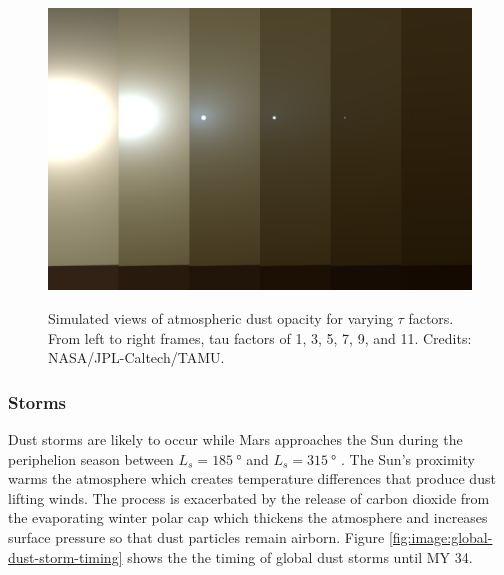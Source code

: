 
\begin{figure}[h]
  \centering
  \hypersetup{linkcolor=captionTextColor}
  \includegraphics[width=0.7\linewidth]{sections/mars-solar-energy/solar-radiation/images/tau-factors.png}\\
  \caption[Simulated views of atmospheric dust opacity for varying $\tau$ factors]
          {Simulated views of atmospheric dust opacity for varying $\tau$ factors. From left to right frames, tau factors of 1, 3, 5, 7, 9, and 11. Credits: NASA/JPL-Caltech/TAMU.}
  \label{fig:image:tau-factors}
\end{figure}

\subsubsection{Storms}
\label{sec:MartianEnvironment:Dust:Storms}

Dust storms are likely to occur while Mars approaches the Sun during the periphelion season between $L_{s} = \SI{185}{\degree}$ and $L_{s} = \SI{315}{\degree}$ . The Sun's proximity warms the atmosphere which creates temperature differences that produce dust lifting winds. The process is exacerbated by the release of carbon dioxide from the evaporating winter polar cap which thickens the atmosphere and increases surface pressure so that dust particles remain airborn. Figure \ref{fig:image:global-dust-storm-timing} shows the the timing of global dust storms until \ac{MY} 34.

